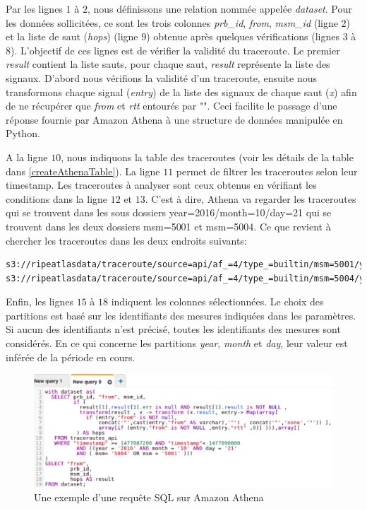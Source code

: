 Par les lignes $1$ à $2$, nous définissons  une relation nommée appelée \textit{dataset}.
Pour les données sollicitées, ce sont les trois colonnes \textit{prb\_id}, \textit{from}, \textit{msm\_id} (ligne $2$) et la liste de saut (\textit{hops}) (ligne $9$)  obtenue après quelques vérifications (lignes $3$ à $8$). L'objectif de ces lignes est de vérifier la validité du traceroute.  Le premier \textit{result} contient la liste sauts, pour chaque saut, \textit{result} représente la liste des signaux. D'abord nous vérifions la validité d'un traceroute, ensuite nous transformons chaque signal (\textit{entry}) de la liste des signaux de chaque saut (\textit{x}) afin de ne récupérer que \textit{from} et \textit{rtt} entourés par "".  Ceci  facilite le passage d'une réponse fournie par Amazon Athena à une structure de données manipulée en Python.

 A la ligne $10$, nous indiquons  la table des  traceroutes (voir les détails de la table dans \ref{createAthenaTable}). La ligne $11$ permet de filtrer les traceroutes selon leur timestamp.
 Les traceroutes à analyser sont ceux obtenus en vérifiant les conditions dans la ligne  $12$ et $13$. C'est à dire, Athena va regarder les traceroutes qui se trouvent dans les sous dossiers year=2016/month=10/day=21 qui se trouvent  dans les deux dossiers msm=5001 et msm=5004. Ce que revient à chercher les traceroutes dans les deux endroits suivants:

\begin{lstlisting}[basicstyle= \footnotesize]
s3://ripeatlasdata/traceroute/source=api/af_=4/type_=builtin/msm=5001/year=2016/month=10/day=21
s3://ripeatlasdata/traceroute/source=api/af_=4/type_=builtin/msm=5004/year=2016/month=10/day=21
\end{lstlisting}

Enfin, les lignes $15$ à $18$  indiquent les  colonnes  sélectionnées.
Le choix des partitions est basé sur les identifiants des mesures indiquées dans les paramètres. Si aucun des identifiants n'est précisé, toutes les identifiants des mesures sont considérés. En ce qui concerne les partitions \textit{year}, \textit{month} et \textit{day}, leur valeur est inférée de la période en cours.

\begin{figure}[h]
	\centering
	\includegraphics[width=1\linewidth]{illustrations/sqlRequestAthena2.png}
	\caption{Une exemple d'une requête SQL sur Amazon Athena}
	\label{fig:sqlrequestathena}
\end{figure}




